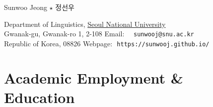 \documentclass[letterpaper]{article}
\def\name{Sunwoo Jeong $\star$ 정선우}
\begin{document}
{\huge \name}



\vspace{0.28in}


\begin{minipage}{\linewidth}
  Department of Linguistics, \href{http://hosting01.snu.ac.kr/~linguist/}{Seoul National University} \\ 
  Gwanak-gu, Gwanak-ro 1, 2-108 \hfill Email:\,\,\,\,\,\, {\tt sunwooj@snu.ac.kr} \\
  Republic of Korea, 08826 \hfill Webpage:\,\, {\tt https://sunwooj.github.io/} 
\end{minipage}


\section*{Academic Employment \& Education}
\end{document}

